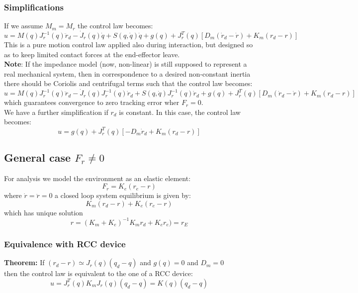 \documentclass[a4paper,12pt]{article}
\begin{document}
\subsubsection{Simplifications}
If we assume $M_m = M_r$ the control law becomes:
\begin{equation}
u=M(q)J_r^{-1}(q){\ddot{r}_d-\dot{J}_r(q)\dot{q}}+S(q,\dot{q})\dot{q}+g(q)+J_r^T(q)[
    D_m(\dot{r}_d-\dot{r})+K_m(r_d-r)]
\end{equation}
This is a pure motion control law applied also during interaction,
but designed so as to keep limited contact forces
 at the end-effector leave.\\
\textbf{Note}: If the impedance model (now, non-linear) is still supposed to
represent a real mechanical system, then in correspondence to a desired
non-constant inertia there should be Coriolis and centrifugal terms such that
the control law becomes: \begin{equation}
u=M(q)J_r^{-1}(q){\ddot{r}_d-\dot{J}_r(q)J_r^{-1}(q)\dot{r}_d}+
S(q,\dot{q})J_r^{-1}(q)\dot{r}_d+g(q)+J_r^T(q)[
    D_m(\dot{r}_d-\dot{r})+K_m(r_d-r)]
\end{equation}
which guarantees convergence to zero tracking error wher $F_r=0$.\\
We have a further simplification if $r_d$ is constant. In this case, the control law becomes:
\begin{equation}
u=g(q)+J_r^T(q)[-D_m\dot{r}_d+K_m(r_d-r)]
\end{equation}
\subsection{General case $F_r \neq 0$}
For analysis we model the environment as an elastic element: 
\begin{equation}
F_r=K_e(r_e-r)
\end{equation}
where $\dot{r}=\ddot{r}=0$ a closed loop system equilibrium is given by:
\begin{equation}
K_m(r_d-r)+K_e(r_e-r)
\end{equation}
which has unique solution
\begin{equation}
r=(K_m+K_e)^{-1}K_mr_d+K_er_e)=r_E
\end{equation}
\subsubsection{Equivalence with RCC device}
\textbf{Theorem:}
If $(r_d-r) \simeq J_r(q)(q_d-q)$ and $g(q)=0$ and $D_m=0$\\
then the control law is equivalent to the one of a RCC device:\\
\begin{equation}
    u = J_r^T(q)K_mJ_r(q)(q_d-q)=K(q)(q_d-q)
\end{equation}
\end{document}
